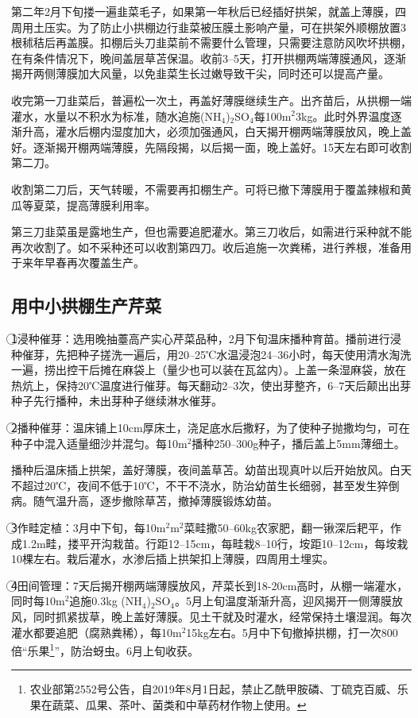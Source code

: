 \documentclass{ctexbook}
\begin{document}
第二年2月下旬搂一遍韭菜毛子，如果第一年秋后已经插好拱架，就盖上薄膜，四周用土压实。为了防止小拱棚边行韭菜被压膜土影响产量，可在拱架外顺棚放置3根秫秸后再盖膜。扣棚后头刀韭菜前不需要什么管理，只需要注意防风吹坏拱棚，在有条件情况下，晚间盖层草苫保温。收前3--5天，打开拱棚两端薄膜通风，逐渐揭开两侧薄膜加大风量，以免韭菜生长过嫩导致干尖，同时还可以提高产量。

收完第一刀韭菜后，普遍松一次土，再盖好薄膜继续生产。出齐苗后，从拱棚一端灌水，水量以不积水为标准，随水追施(NH$_4$)$_2$SO$_4$每100m$^2$3kg。此时外界温度逐渐升高，灌水后棚内湿度加大，必须加强通风，白天揭开棚两端薄膜放风，晚上盖好。逐渐揭开棚两端薄膜，先隔段揭，以后揭一面，晚上盖好。15天左右即可收割第二刀。

收割第二刀后，天气转暖，不需要再扣棚生产。可将已撤下薄膜用于覆盖辣椒和黄瓜等夏菜，提高薄膜利用率。

第三刀韭菜虽是露地生产，但也需要追肥灌水。第三刀收后，如需进行采种就不能再次收割了。如不采种还可以收割第四刀。收后追施一次粪稀，进行养根，准备用于来年早春再次覆盖生产。
\subsection{用中小拱棚生产芹菜}
\textcircled{1}浸种催芽：选用晚抽薹高产实心芹菜品种，2月下旬温床播种育苗。播前进行浸种催芽，先把种子搓洗一遍后，用20--25℃水温浸泡24--36小时，每天使用清水淘洗一遍，捞出控干后摊在麻袋上（量少也可以装在瓦盆内）。上盖一条湿麻袋，放在热炕上，保持20℃温度进行催芽。每天翻动2--3次，使出芽整齐，6--7天后颠出出芽种子先行播种，未出芽种子继续淋水催芽。

\textcircled{2}播种催芽：温床铺上10cm厚床土，浇足底水后撒籽，为了使种子抛撒均匀，可在种子中混入适量细沙并混匀。每10m$^2$播种250--300g种子，播后盖上5mm薄细土。

播种后温床插上拱架，盖好薄膜，夜间盖草苫。幼苗出现真叶以后开始放风。白天不超过20℃，夜间不低于10℃，不干不浇水，防治幼苗生长细弱，甚至发生猝倒病。随气温升高，逐步撤除草苫，撤掉薄膜锻炼幼苗。

\textcircled{3}作畦定植：3月中下旬，每10m$^2$m$^2$菜畦撒50--60kg农家肥，翻一锹深后耙平，作成1.2m畦，搂平开沟栽苗。行距12--15cm，每畦栽8--10行，垵距10--12cm，每垵栽10棵左右。栽后灌水，水渗后插上拱架扣上薄膜，四周用土埋实。

\textcircled{4}田间管理：7天后揭开棚两端薄膜放风，芹菜长到18-20cm高时，从棚一端灌水，同时每10m$^2$追施0.3kg (NH$_4$)$_2$SO$_4$。5月上旬温度渐渐升高，迎风揭开一侧薄膜放风，同时抓紧拔草，晚上盖好薄膜。见土干就及时灌水，经常保持土壤湿润。每次灌水都要追肥（腐熟粪稀），每10m$^2$15kg左右。5月中下旬撤掉拱棚，打一次800倍“乐果\footnote{农业部第2552号公告，自2019年8月1日起，禁止乙酰甲胺磷、丁硫克百威、乐果在蔬菜、瓜果、茶叶、菌类和中草药材作物上使用。}”，防治蚜虫。6月上旬收获。
\end{document}
